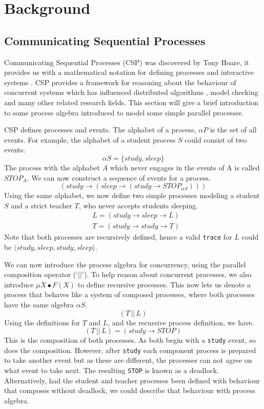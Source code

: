 \chapter{Background}
\section{Communicating Sequential Processes} \label{csp_section}
Communicating Sequential Processes (CSP) was discovered by Tony Hoare, it provides us with a mathematical notation for defining processes and interactive systems \cite{csp_paper}. CSP provides a framework for reasoning about the behaviour of concurrent systems which has influenced distributed algorithms \cite{distributed_algorithms_na_lynch}, model checking \cite{model_checking} and many other related research fields. This section will give a brief introduction to some process algebra introduced to model some simple parallel processes.
\par
CSP defines processes and events. The alphabet of a process, $\alpha P$ is the set of all events. For example, the alphabet of a student process $S$ could consist of two events.
\[
\alpha S = \{study, sleep\}
\]
The process with the alphabet $A$ which never engages in the events of A is called $STOP_A$. We can now construct a sequence of events for a process.
\[
(study \rightarrow (sleep \rightarrow (study \rightarrow STOP_{\alpha S})))
\]
Using the same alphabet, we now define two simple processes modeling a student $S$ and a strict teacher $T$, who never accepts students sleeping.
\[
\begin{aligned}
& L = (study \rightarrow sleep \rightarrow L) \\
& T = (study \rightarrow study \rightarrow T) 
\end{aligned}
\]
Note that both processes are recursively defined, hence a valid \texttt{trace} for $L$ could be $\langle study, sleep, study, sleep \rangle$.
\par
We can now introduce the process algebra for concurrency, using the parallel composition operator (`||'). To help reason about concurrent processes, we also introduce $\mu X \bullet F(X)$ to define recursive processes. This now lets us denote a process that behaves like a system of composed processes, where both processes have the same algebra $\alpha S$.
\[
(T \,||\, L)    
\]
Using the definitions for $T$ and $L$, and the recursive process definition, we have.
\[
(T \,||\, L) = (study \rightarrow STOP)    
\]
This is the composition of both processes. As both begin with a \texttt{study} event, so does the composition. However, after \texttt{study} each component process is prepared to take another event but as these are different, the processes can not agree on what event to take next. The resulting \texttt{STOP} is known as a deadlock. Alternatively, had the student and teacher processes been defined with behaviour that composes without deadlock, we could describe that behaviour with process algebra.

